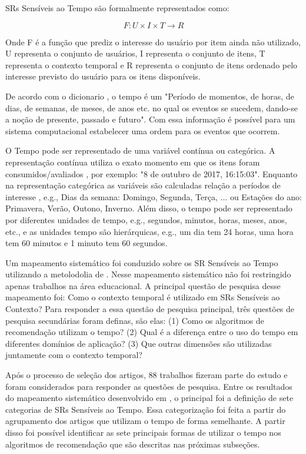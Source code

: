 SRs Sensíveis ao Tempo são formalmente representados como:

\begin{equation}
  F: U \times I \times T \rightarrow R
  \label{eq:time-aware}
\end{equation}

Onde F é a função que prediz o interesse do usuário por item ainda não utilizado, U representa o conjunto de usuários,
I representa o conjunto de itens, T representa o contexto temporal e R representa o conjunto de itens ordenado pelo interesse previsto do usuário para os itens disponíveis.

De acordo com o dicionario , o tempo é um  "Período de momentos, de horas, de dias,
de semanas, de meses, de anos etc. no qual os eventos se sucedem, dando-se a noção de presente, passado e futuro".
Com essa informação é possível para um sistema computacional estabelecer uma ordem para os eventos que ocorrem.

O Tempo pode ser representado de uma variável contínua ou categórica. A representação contínua utiliza o exato momento
em que os itens foram consumidos/avaliados \cite{campos2014time}, por exemplo: "8 de outubro de 2017, 16:15:03".
Enquanto na representação categórica as variáveis são calculadas relação a períodos de interesse \cite{campos2014time},
e.g., Dias da semana: {Domingo, Segunda, Terça, ...} ou Estações do ano: {Primavera, Verão, Outono, Inverno}. Além
disso, o tempo pode ser representado por diferentes unidades de tempo, e.g., segundos, minutos, horas, meses, anos,
etc., e as unidades tempo são hierárquicas, e.g., um dia tem 24 horas, uma hora tem 60 minutos e 1 minuto tem 60
segundos.

Um mapeamento sistemático foi conduzido sobre os SR Sensíveis ao Tempo \cite{de2017time} utilizando a metolodolia de
. Nesse mapeamento sistemático não foi restringido apenas trabalhos na área
educacional. A principal questão de pesquisa desse mapeamento foi: Como o contexto temporal é utilizado em SRs
Sensíveis ao Contexto? Para responder a essa questão de pesquisa principal, três questões de pesquisa secundárias
foram definas, são elas: (1) Como os algoritmos de recomendação utilizam o tempo? (2) Qual é a diferença entre o uso
do tempo em diferentes domínios de aplicação? (3) Que outras dimensões são utilizadas juntamente com o contexto
temporal?

Após o processo de seleção dos artigos, 88 trabalhos fizeram parte do estudo e foram considerados para responder as
questões de pesquisa. Entre os resultados do mapeamento sistemático desenvolvido em , o principal
foi a definição de sete categorias de SRs Sensíveis ao Tempo. Essa categorização foi feita a partir do agrupamento
dos artigos que utilizam o tempo de forma semelhante. A partir disso foi possível identificar as sete principais
formas de utilizar o tempo nos algoritmos de recomendação que são descritas nas próximas subseções.

